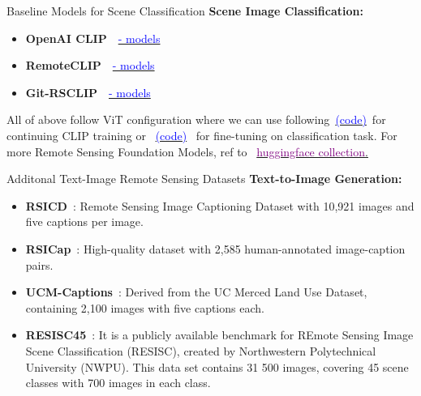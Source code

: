 \begin{refsection}
  \begin{frame}{Baseline Models for Scene Classification}
    \textbf{Scene Image Classification:}
    \begin{itemize}
      \item \textbf{OpenAI CLIP}~\parencite{radfordLearningTransferableVisual2021}~\href{https://hf-mirror.com/openai/clip-vit-base-patch16}{\textcolor{blue}{- models}}
      \item \textbf{RemoteCLIP}~\parencite{liuRemoteCLIPVisionLanguage2024}~\href{https://hf-mirror.com/MVRL/remote-clip-vit-base-patch32}{\textcolor{blue}{- models}}
      \item \textbf{Git-RSCLIP}~\parencite{text2earth2025}~\href{https://hf-mirror.com/lcybuaa/Git-RSCLIP-base}{\textcolor{blue}{- models}}
    \end{itemize}
    All of above follow ViT configuration where we can use following~\href{https://github.com/huggingface/transformers/blob/main/examples/pytorch/contrastive-image-text/README.md}{\textcolor{blue}{(code)}}~for continuing CLIP training or ~\href{https://github.com/NielsRogge/Transformers-Tutorials/tree/master/VisionTransformer}{\textcolor{blue}{(code)}}~ for fine-tuning on classification task.
    For more Remote Sensing Foundation Models, ref to ~\href{https://hf-mirror.com/collections/MVRL/remote-sensing-foundation-models-664e8fcd67d8ca8c03f42d00}{\textcolor{purple}{huggingface collection}.}
    \bottomleftrefs
  \end{frame}
  \end{refsection}

\begin{refsection}
  \begin{frame}{Additonal Text-Image Remote Sensing Datasets}
    \textbf{Text-to-Image Generation:}
    \begin{itemize}
      \item \textbf{RSICD}~\parencite{lu2017exploring}: Remote Sensing Image Captioning Dataset with 10,921 images and five captions per image.
      \item \textbf{RSICap}~\parencite{hu2023rsgpt}: High-quality dataset with 2,585 human-annotated image-caption pairs.
      \item \textbf{UCM-Captions}~\parencite{qu2016deep}: Derived from the UC Merced Land Use Dataset, containing 2,100 images with five captions each.
      \item \textbf{RESISC45}~\parencite{Cheng2017}: It is a publicly available benchmark for REmote Sensing Image Scene Classification (RESISC), created by Northwestern Polytechnical University (NWPU). This data set contains 31 500 images, covering 45 scene classes with 700 images in each class.
    \end{itemize}
    \bottomleftrefs
  \end{frame}
\end{refsection}

